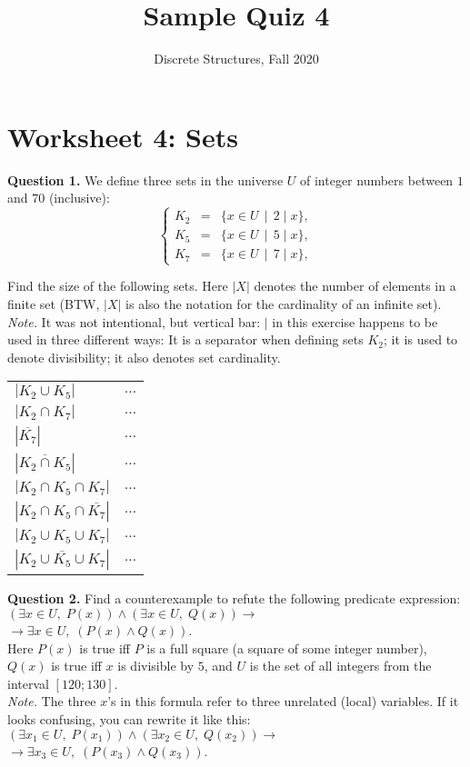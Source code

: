 \documentclass[jou]{apa6}
\title{Sample Quiz 4}
\author{Discrete Structures, Fall 2020}
\affiliation{RBS}
\begin{document}

\twocolumn
\section{Worksheet 4: Sets}

\vspace{10pt}
{\bf Question 1.} We define three sets in the universe $U$ of integer numbers
between $1$ and $70$ (inclusive):
$$\left\{ \begin{array}{rcl}
K_2 & = & \{ x \in U \,\mid\, 2 \mid x \},\\
K_5 & = & \{ x \in U \,\mid\, 5 \mid x \},\\
K_7 & = & \{ x \in U \,\mid\, 7 \mid x \},
\end{array} \right.$$

Find the size of the following sets.
Here $|X|$ denotes the number of elements in a finite set
(BTW, $|X|$ is also the notation for the cardinality of an infinite set).\\
{\em Note.} It was not intentional, but vertical bar: $\mid$
in this exercise happens to be used in three different ways: 
It is a separator when defining sets $K_2$; it is used to denote
divisibility; it also denotes set cardinality.

\begin{tabular}{ll} 
$\left| K_2 \cup K_5 \right|$ & $\ldots$ \\ 
$\left| K_2 \cap K_7 \right|$ & $\ldots$ \\ 
$\left| \overline{K_7} \right|$ & $\ldots$ \\
$\left| \overline{K_2 \cap K_5} \right|$ & $\ldots$ \\
$\left| K_2 \cap K_5 \cap K_7 \right|$ & $\ldots$ \\ 
$\left| K_2 \cap K_5 \cap \overline{K_7} \right|$ & $\ldots$ \\ 
$\left| K_2 \cup K_5 \cup K_7 \right|$ & $\ldots$ \\ 
$\left| \overline{K_2 \cup K_5 \cup K_7} \right|$ & $\ldots$ \\ 
\end{tabular}


\vspace{6pt}
{\bf Question 2.}
Find a counterexample to refute the following predicate expression:\\
$(\exists x \in U,\;P(x)) \wedge (\exists x\in U,\;Q(x)) \rightarrow$\\
$\rightarrow \exists x\in U,\;(P(x) \wedge Q(x))$.\\
Here $P(x)$ is true iff $P$ is a full square (a square of some integer number), 
$Q(x)$ is true iff $x$ is divisible by $5$, and $U$ is the set of all integers 
from the interval $[120;130]$.\\
{\em Note.} The three $x$'s in this formula refer to 
three unrelated (local) variables. 
If it looks confusing, you can rewrite it like this:\\
$(\exists x_1 \in U,\;P(x_1)) \wedge (\exists x_2\in U,\;Q(x_2)) \rightarrow$\\
$\rightarrow \exists x_3\in U,\;(P(x_3) \wedge Q(x_3))$.
\end{document}
